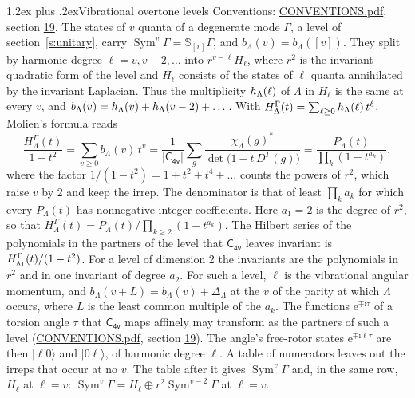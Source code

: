 \documentclass[10pt,a4paper]{article}
\makeatletter
\renewcommand\section{\@startsection{section}{1}{\z@}{-3ex plus -1ex minus -.2ex}%
  {1.2ex plus .2ex}{\normalfont\large\sffamily\bfseries\color{parttitle}}}
\numberwithin{equation}{section}
\newcommand{\grp}[1]{\mathsf{#1}}
\newcommand{\irr}[1]{\text{\normalfont\scshape #1}}
\newcommand{\iunit}{\mathrm{i}}
\newcommand{\expe}{\mathrm{e}}
\newcommand{\repD}[1]{D^{#1}}
\newcommand{\irchar}[1]{\chi_{#1}}
\newcommand{\conj}[1]{{#1}^{*}}
\newcommand{\schur}[1]{\mathbb{S}_{#1}}
\newcommand{\shape}[1]{[#1]}
\newcommand{\occ}[1]{\lvert #1\rangle}
\makeatother
\begin{document}
\section{Vibrational overtone levels}\label{s:overtones}
Conventions: \href{../../CONVENTIONS.pdf}{CONVENTIONS.pdf}, section \href{../../CONVENTIONS.pdf\#conv.19}{19}.
\leavevmode\label{n:index.quanta}\label{n:operator.symmetric.power}The states of $v$ quanta of a degenerate mode $\Gamma$, a level of section~\ref{s:unitary}, carry $\operatorname{Sym}^{v}\Gamma = \schur{\shape{v}}\Gamma$, and $b_\Lambda(v) = b_\Lambda(\shape{v})$. \label{n:local.quadratic.form}\label{n:set.harmonic}They split by harmonic degree $\ell = v, v - 2, \dots$ into $r^{v-\ell}H_\ell$, where $r^2$ is the invariant quadratic form of the level and $H_\ell$ consists of the states of $\ell$ quanta annihilated by the invariant Laplacian. \label{n:function.multiplicity.harmonic}Thus the multiplicity $\mathnormal{h}_\Lambda(\ell)$ of $\Lambda$ in $H_\ell$ is the same at every $v$, and $b_\Lambda(v) = \mathnormal{h}_\Lambda(v) + \mathnormal{h}_\Lambda(v - 2) + \dots$. \label{n:function.generating.level}With $H^{\Gamma}_\Lambda(t) = \sum_{\ell\ge0} \mathnormal{h}_\Lambda(\ell)\,t^{\ell}$, Molien's formula reads
\begin{equation}\label{e:molien}\frac{H^{\Gamma}_\Lambda(t)}{1 - t^2} = \sum_{v\ge0} b_\Lambda(v)\,t^v = \frac{1}{|\grp{C_{4v}}|}\sum_{g}\frac{\conj{\irchar{\Lambda}(g)}}{\det\bigl(1 - t\,\repD{\Gamma}(g)\bigr)} = \frac{P_\Lambda(t)}{\prod_k (1-t^{a_k})},\end{equation}
where the factor $1/(1 - t^2) = 1 + t^2 + t^4 + \dots$ counts the powers of $r^2$, which raise $v$ by 2 and keep the irrep. The denominator is that of least $\prod_k a_k$ for which every $P_\Lambda(t)$ has nonnegative integer coefficients. Here $a_1 = 2$ is the degree of $r^2$, so that $H^{\Gamma}_\Lambda(t) = P_\Lambda(t)/\prod_{k\ge2}(1 - t^{a_k})$. The Hilbert series of the polynomials in the partners of the level that $\grp{C_{4v}}$ leaves invariant is $H^{\Gamma}_{\irr{a}_{1}}(t)/(1 - t^2)$. For a level of dimension 2 the invariants are the polynomials in $r^2$ and in one invariant of degree $a_2$. \label{n:index.overtone.period}\label{n:index.increment.unitary}For such a level, $\ell$ is the vibrational angular momentum, and $b_\Lambda(v + L) = b_\Lambda(v) + \Delta_\Lambda$ at the $v$ of the parity at which $\Lambda$ occurs, where $L$ is the least common multiple of the $a_k$. \label{n:local.torsion.angle}The functions $\expe^{\mp\iunit\tau}$ of a torsion angle $\tau$ that $\grp{C_{4v}}$ maps affinely may transform as the partners of such a level (\href{../../CONVENTIONS.pdf}{CONVENTIONS.pdf}, section \href{../../CONVENTIONS.pdf\#conv.19}{19}). The angle's free-rotor states $\expe^{\mp\iunit\ell\tau}$ are then $\occ{\ell 0}$ and $\occ{0 \ell}$, of harmonic degree $\ell$. A table of numerators leaves out the irreps that occur at no $v$. The table after it gives $\operatorname{Sym}^{v}\Gamma$ and, in the same row, $H_\ell$ at $\ell = v$: $\operatorname{Sym}^{v}\Gamma = H_\ell \oplus r^2\operatorname{Sym}^{v-2}\Gamma$ at $\ell = v$.
\end{document}
